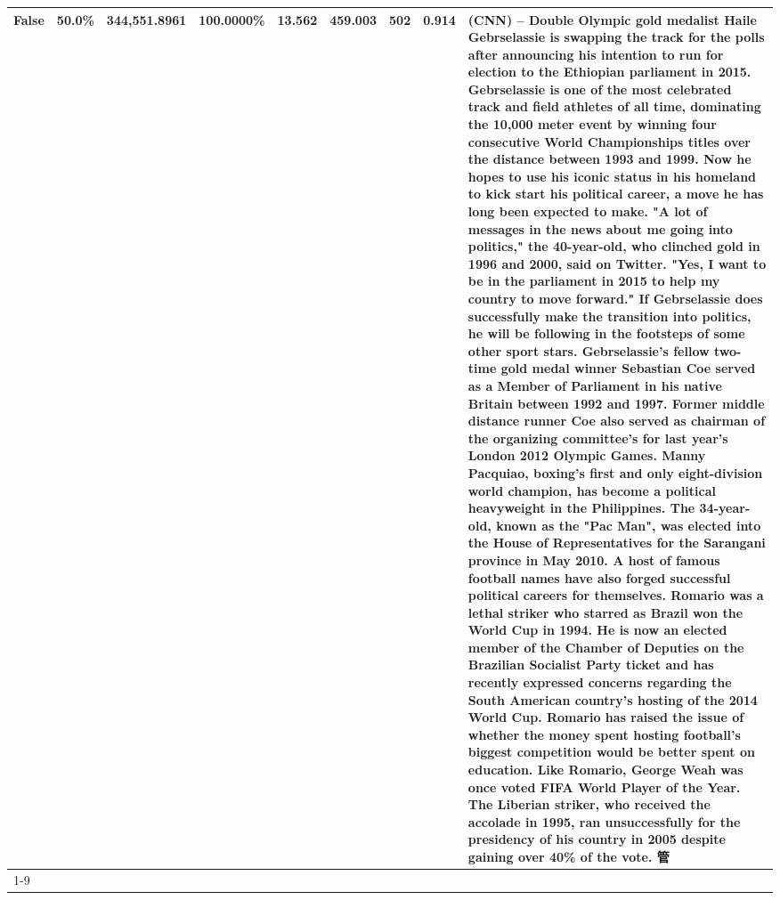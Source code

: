 \begin{table}[H]
{\begin{tabular}{lllrlllll}
False & 50.0\% & 344,551.8961 & \bfseries \color{red} 100.0000\% & 13.562 & 459.003 & 502 & 0.914 & (CNN) -- Double Olympic gold medalist Haile Gebrselassie is swapping the track for the polls after announcing his intention to run for election to the Ethiopian parliament in 2015. Gebrselassie is one of the most celebrated track and field athletes of all time, dominating the 10,000 meter event by winning four consecutive World Championships titles over the distance between 1993 and 1999. Now he hopes to use his iconic status in his homeland to kick start his political career, a move he has long been expected to make. "A lot of messages in the news about me going into politics," the 40-year-old, who clinched gold in 1996 and 2000, said on Twitter. "Yes, I want to be in the parliament in 2015 to help my country to move forward." If Gebrselassie does successfully make the transition into politics, he will be following in the footsteps of some other sport stars. Gebrselassie's fellow two-time gold medal winner Sebastian Coe served as a Member of Parliament in his native Britain between 1992 and 1997. Former middle distance runner Coe also served as chairman of the organizing committee's for last year's London 2012 Olympic Games. Manny Pacquiao, boxing's first and only eight-division world champion, has become a political heavyweight in the Philippines. The 34-year-old, known as the "Pac Man", was elected into the House of Representatives for the Sarangani province in May 2010. A host of famous football names have also forged successful political careers for themselves. Romario was a lethal striker who starred as Brazil won the World Cup in 1994. He is now an elected member of the Chamber of Deputies on the Brazilian Socialist Party ticket and has recently expressed concerns regarding the South American country's hosting of the 2014 World Cup. Romario has raised the issue of whether the money spent hosting football's biggest competition would be better spent on education. Like Romario, George Weah was once voted FIFA World Player of the Year. The Liberian striker, who received the accolade in 1995, ran unsuccessfully for the presidency of his country in 2005 despite gaining over 40\% of the vote. 管 \\
\cline{1-9}

\end{tabular}}
\end{table}
